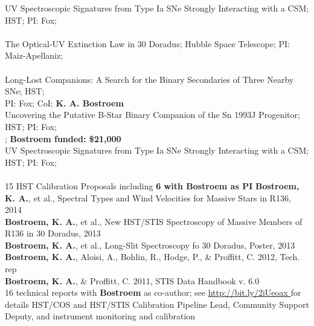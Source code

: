 \documentclass[10pt]{cv}
\begin{document}
\begin{llist}
UV Spectroscopic Signatures from Type Ia SNe Strongly Interacting with a CSM; HST; PI: Fox; \\
\hspace*{24pt}{\bf CoI: K. A. Bostroem} \\
The Optical-UV Extinction Law in 30 Doradus; Hubble Space Telescope; PI: Maiz-Apellaniz; \\
 \hspace*{24pt}{\bf Admin PI: K. A. Bostroem; Bostroem funded: \$58,500} \\
Long-Lost Companions: A Search for the Binary Secondaries of Three Nearby SNe; HST; \\
\hspace*{24pt}PI: Fox; CoI; {\bf K. A. Bostroem} \\
Uncovering the Putative B-Star Binary Companion of the Sn 1993J Progenitor; HST; PI: Fox; \\
\hspace*{24pt}{\bf CoI: K. A. Bostroem}; {\bf Bostroem funded: \$21,000} \\
UV Spectroscopic Signatures from Type Ia SNe Strongly Interacting with a CSM; HST; PI: Fox; \\
\hspace*{24pt}{\bf CoI: K. A. Bostroem}  \\
15 HST Calibration Proposals including {\bf 6 with Bostroem as PI}
%
{\bf Bostroem, K. A.}, et al., Spectral Types and Wind Velocities for Massive Stars in R136, 2014\\
{\bf Bostroem, K. A.}, et al., New HST/STIS Spectroscopy of Massive Members of R136 in 30 Doradus, 2013\\
{\bf Bostroem, K. A.}, et al., Long-Slit Spectroscopy fo 30 Doradus, Poster, 2013\\
{\bf Bostroem, K. A.}, Aloisi, A., Bohlin, R., Hodge, P., \& Proffitt, C. 2012, Tech. rep \\
{\bf Bostroem, K. A.}, \& Proffitt, C. 2011, STIS Data Handbook v. 6.0\\
16 technical reports with {\bf Bostroem} as co-author; see \color{blue}\url{http://bit.ly/2iUeoax }\color{black}\hspace*{0pt} for details
%
HST/COS and HST/STIS Calibration Pipeline Lead, Community Support Deputy, and instrument monitoring and calibration
%

\end{llist}
\end{document}
